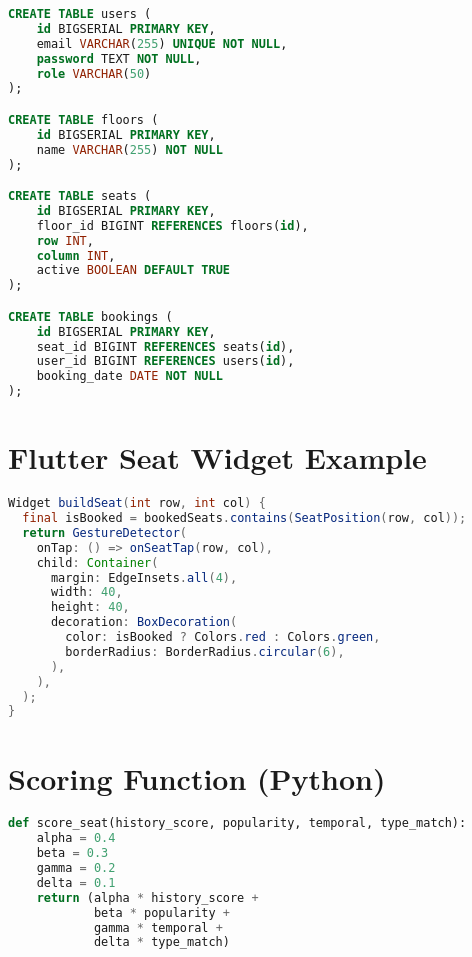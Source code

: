 \documentclass[12pt,a4paper]{report}
\begin{document}
\begin{lstlisting}[language=SQL, caption=Database Schema, label=lst:sql-schema]
CREATE TABLE users (
    id BIGSERIAL PRIMARY KEY,
    email VARCHAR(255) UNIQUE NOT NULL,
    password TEXT NOT NULL,
    role VARCHAR(50)
);

CREATE TABLE floors (
    id BIGSERIAL PRIMARY KEY,
    name VARCHAR(255) NOT NULL
);

CREATE TABLE seats (
    id BIGSERIAL PRIMARY KEY,
    floor_id BIGINT REFERENCES floors(id),
    row INT,
    column INT,
    active BOOLEAN DEFAULT TRUE
);

CREATE TABLE bookings (
    id BIGSERIAL PRIMARY KEY,
    seat_id BIGINT REFERENCES seats(id),
    user_id BIGINT REFERENCES users(id),
    booking_date DATE NOT NULL
);
\end{lstlisting}

\chapter{Flutter Seat Widget Example}
\label{appendix:flutter}

\begin{lstlisting}[language=Java, caption=Seat Booking Widget (Flutter), label=lst:flutter-ui]
Widget buildSeat(int row, int col) {
  final isBooked = bookedSeats.contains(SeatPosition(row, col));
  return GestureDetector(
    onTap: () => onSeatTap(row, col),
    child: Container(
      margin: EdgeInsets.all(4),
      width: 40,
      height: 40,
      decoration: BoxDecoration(
        color: isBooked ? Colors.red : Colors.green,
        borderRadius: BorderRadius.circular(6),
      ),
    ),
  );
}
\end{lstlisting}

\chapter{Scoring Function (Python)}
\label{appendix:scoring}

\begin{lstlisting}[language=Python, caption=Seat Scoring Function (Python), label=lst:scoring-function]
def score_seat(history_score, popularity, temporal, type_match):
    alpha = 0.4
    beta = 0.3
    gamma = 0.2
    delta = 0.1
    return (alpha * history_score +
            beta * popularity +
            gamma * temporal +
            delta * type_match)
\end{lstlisting}
\end{document}
